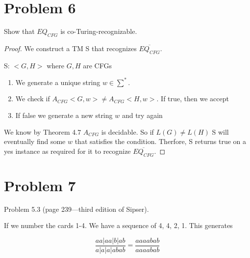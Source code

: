 \documentclass[11pt]{article}
\begin{document}
\newpage
\section*{Problem 6}

Show that $EQ_{CFG}$ is co-Turing-recognizable.
\newline

\begin{proof}


We construct a TM S that recognizes $\overline{EQ_{CFG}}$. 

S: $<G,H>$ where $G, H$ are CFGs
\begin{enumerate}[1.]
	\item We generate a unique string $w \in \sum^*$.
	\item We check if $A_{CFG}<G, w> \neq A_{CFG}<H,w>$. If true, then we accept
	\item If false we generate a new string $w$ and try again
\end{enumerate}

We know by Theorem 4.7 $A_{CFG}$ is decidable. So if $L(G) \neq L(H)$ S will eventually find some $w$ that satisfies the condition. Therfore, S returns true on a yes instance as required for it to recognize $\overline{EQ_{CFG}}$.

\end{proof}


\newpage
\section*{Problem 7}

Problem 5.3 (page 239---third edition of Sipser).
\newline

If we number the cards 1-4. We have a sequence of 4, 4, 2, 1. This generates

$$\frac{aa | aa | b | ab}{a | a | a | abab} = \frac{aaaabab}{aaaabab}$$
\end{document}
